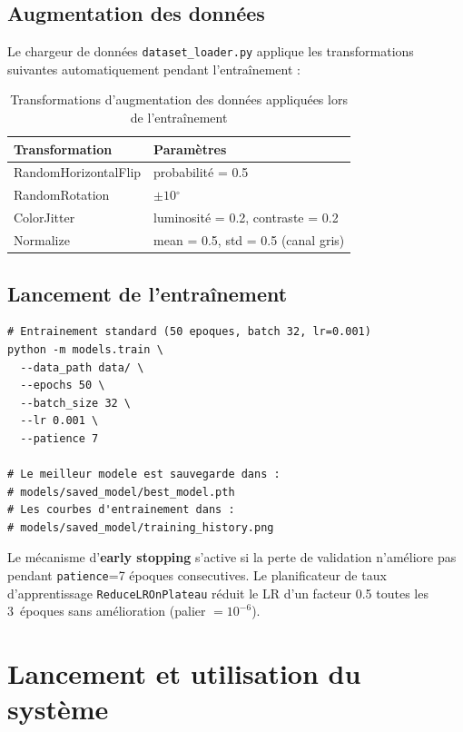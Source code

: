 \documentclass[12pt,a4paper]{report}
\newcommand{\degr}{\ensuremath{^{\circ}}}
\begin{document}
\subsection{Augmentation des donn\'ees}

Le chargeur de donn\'ees \texttt{dataset\_loader.py} applique les transformations suivantes automatiquement pendant l'entra\^inement :

\begin{table}[H]
\centering
\caption{Transformations d'augmentation des donn\'ees appliqu\'ees lors de l'entra\^inement}
\label{tab:augmentation}
\begin{tabular}{L{4.5cm} L{7cm}}
\toprule
\textbf{Transformation} & \textbf{Param\`etres} \\
\midrule
RandomHorizontalFlip & probabilit\'e = 0.5 \\
RandomRotation & $\pm10\degr$ \\
ColorJitter & luminosit\'e = 0.2, contraste = 0.2 \\
Normalize & mean = 0.5, std = 0.5 (canal gris) \\
\bottomrule
\end{tabular}
\end{table}

\subsection{Lancement de l'entra\^inement}

\begin{lstlisting}[style=python, caption={Commande d'entraînement du mod\`ele CNN}, label=lst:train]
# Entrainement standard (50 epoques, batch 32, lr=0.001)
python -m models.train \
  --data_path data/ \
  --epochs 50 \
  --batch_size 32 \
  --lr 0.001 \
  --patience 7

# Le meilleur modele est sauvegarde dans :
# models/saved_model/best_model.pth
# Les courbes d'entrainement dans :
# models/saved_model/training_history.png
\end{lstlisting}

Le m\'ecanisme d'\textbf{early stopping} s'active si la perte de validation n'am\'eliore pas pendant \texttt{patience}=7 \'epoques consecutives. Le planificateur de taux d'apprentissage \texttt{ReduceLROnPlateau} r\'eduit le LR d'un facteur 0.5 toutes les 3~\'epoques sans am\'elioration (palier $= 10^{-6}$).

\section{Lancement et utilisation du syst\`eme}
\end{document}
